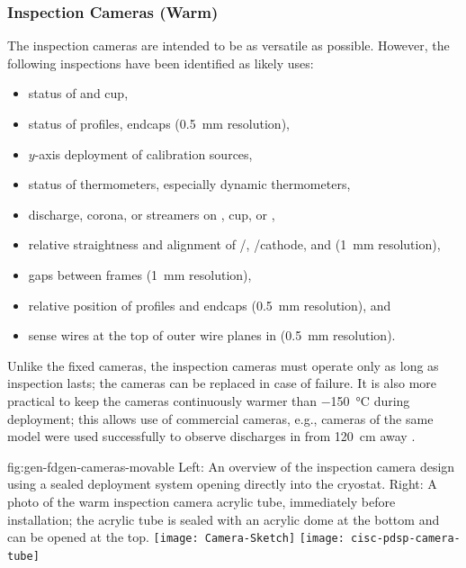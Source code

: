 \subsubsection{Inspection Cameras (Warm)}

The inspection cameras are intended to be as versatile as possible.
However, the following %
inspections have been identified as likely uses:
\begin{itemize}
\item status of  \fdth and cup,
\item status of  profiles, endcaps (\SI{0.5}{mm} resolution),
\item $y$-axis deployment of calibration sources,
\item status of thermometers, especially dynamic thermometers,
\item {} discharge, corona, or streamers on  \fdth, cup, or ,
\item relative straightness and alignment of /, /cathode, and  (\SI{1}{mm} resolution),
\item gaps between  frames (\SI{1}{mm} resolution),
\item relative position of profiles and endcaps (\SI{0.5}{mm} resolution), and 
\item sense wires at the top of outer wire planes in \single {} (\SI{0.5}{mm} resolution).
\end{itemize}

Unlike the fixed cameras, the inspection cameras must operate only as
long as inspection lasts; the cameras can be replaced in case of failure.  It
is also more practical to keep the cameras continuously warmer than
 \SI{-150}{\celsius} during deployment; this allows use of  %
commercial cameras, %
e.g., cameras of the same model were used successfully to observe discharges
in \lar from \SI{120}{cm} away \cite{Auger:2015xlo}.


\begin{dunefigure}{fig:gen-fdgen-cameras-movable}
  {Left: An overview of the inspection camera design using a sealed deployment system opening directly into the cryostat. Right: A photo of the  warm inspection camera acrylic tube, immediately before installation; the acrylic tube is sealed with an acrylic dome at the bottom and can be opened at the top.}
  \texttt{[image: Camera-Sketch]}%
  \texttt{[image: cisc-pdsp-camera-tube]}%
\end{dunefigure}

